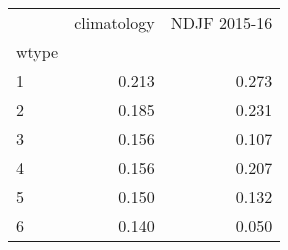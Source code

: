 \begin{tabular}{lrr}
\toprule
{} &  climatology &  NDJF 2015-16 \\
wtype &              &               \\
\midrule
1     &        0.213 &         0.273 \\
2     &        0.185 &         0.231 \\
3     &        0.156 &         0.107 \\
4     &        0.156 &         0.207 \\
5     &        0.150 &         0.132 \\
6     &        0.140 &         0.050 \\
\bottomrule
\end{tabular}
